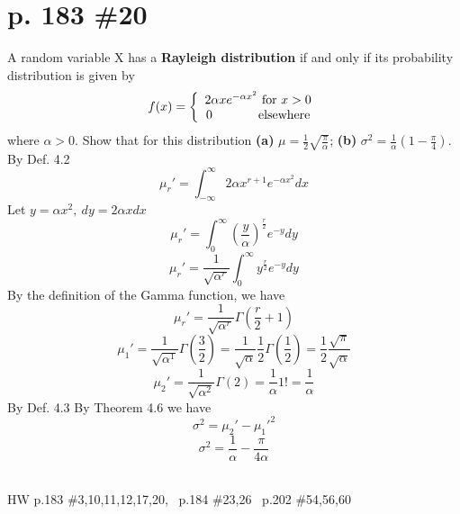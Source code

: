 \documentclass[12pt]{article}
\begin{document}
	\section[20pt]{p. 183 \#20}
	A random variable X has a \textbf{Rayleigh distribution} if and only if its probability distribution is given by
	\[f(x) = \left\{\begin{array}{ccc}
	2\alpha xe^{-\alpha x^2} \textup{ for } x>0\\0 \ \ \ \ \ \ \ \ \ \ \ \textup{elsewhere}
	\end{array}\right.\]
	where \(\alpha > 0\). Show that for this distribution \newline
	\textbf{(a)} \(\mu=\frac{1}{2}\sqrt{\frac{\pi}{\alpha}}\);
	\newline
	\textbf{(b)} \(\sigma^2=\frac{1}{\alpha}\left(1-\frac{\pi}{4}\right)\).
	\newline \newline
	By Def. 4.2
	\[\mu_r'=\int_{-\infty}^{\infty}2\alpha x^{r+1}e^{-\alpha x^2}dx\]
	Let \(y=\alpha x^2,\ dy=2\alpha xdx\)
	\[\mu_r'=\int_{0}^{\infty} \left(\frac{y}{\alpha}\right)^{\frac{r}{2}}e^{-y}dy\]
	\[\mu_r'=\frac{1}{\sqrt{\alpha^r}}\int_{0}^{\infty} y^{\frac{r}{2}}e^{-y}dy\]
	By the definition of the Gamma function, we have
	\[\mu_r'=\frac{1}{\sqrt{\alpha^r}}\Gamma\left(\frac{r}{2}+1\right)\]
	\[\mu_1'=\frac{1}{\sqrt{\alpha^1}}\Gamma\left(\frac{3}{2}\right)=\frac{1}{\sqrt{\alpha}}\frac{1}{2}\Gamma\left(\frac{1}{2}\right)=\frac{1}{2}\frac{\sqrt{\pi}}{\sqrt{\alpha}}\]
	\[\mu_2'=\frac{1}{\sqrt{\alpha^2}}\Gamma\left(2\right)=\frac{1}{\alpha}1!=\frac{1}{\alpha}\]
	By Def. 4.3 \newline
	\newline
	\newline
	By Theorem 4.6 we have
	\[\sigma^2=\mu_2'-{\mu_1'}^2\]
	\[\sigma^2=\frac{1}{\alpha}-\frac{\pi}{4\alpha}\]
	\\
	\newpage
	\maketitle HW p.183 \#3,10,11,12,17,20, \ p.184 \#23,26 \ p.202 \#54,56,60
\end{document}
